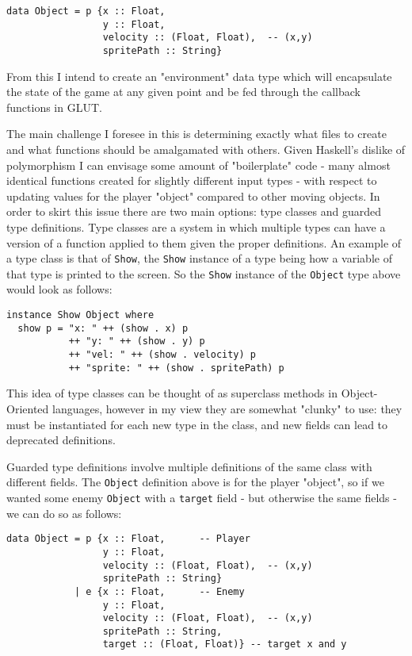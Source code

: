 \documentclass[12pt, a4paper]{report}
\begin{document}
\begin{lstlisting}[]
data Object = p {x :: Float,
                 y :: Float,
                 velocity :: (Float, Float),  -- (x,y)
                 spritePath :: String}
\end{lstlisting}

From this I intend to create an "environment" data type which will encapsulate the state of the game at any given point and be fed through the callback functions in GLUT.

\par

The main challenge I foresee in this is determining exactly what files to create and what functions should be amalgamated with others.
Given Haskell's dislike of polymorphism I can envisage some amount of "boilerplate" code - many almost identical functions created for slightly different input types - with respect to updating values for the player "object" compared to other moving objects.
In order to skirt this issue there are two main options: type classes and guarded type definitions.
Type classes are a system in which multiple types can have a version of a function applied to them given the proper definitions.
An example of a type class is that of \verb|Show|, the \verb|Show| instance of a type being how a variable of that type is printed to the screen.
So the \verb|Show| instance of the \verb|Object| type above would look as follows:

\begin{lstlisting}[]
instance Show Object where
  show p = "x: " ++ (show . x) p
           ++ "y: " ++ (show . y) p
           ++ "vel: " ++ (show . velocity) p
           ++ "sprite: " ++ (show . spritePath) p
\end{lstlisting}

This idea of type classes can be thought of as superclass methods in Object-Oriented languages, however in my view they are somewhat "clunky" to use: they must be instantiated for each new type in the class, and new fields can lead to deprecated definitions.

\par

Guarded type definitions involve multiple definitions of the same class with different fields.
The \verb|Object| definition above is for the player "object", so if we wanted some enemy \verb|Object| with a \verb|target| field - but otherwise the same fields - we can do so as follows:

\begin{lstlisting}[]
data Object = p {x :: Float,      -- Player
                 y :: Float,
                 velocity :: (Float, Float),  -- (x,y)
                 spritePath :: String}
            | e {x :: Float,      -- Enemy
                 y :: Float,
                 velocity :: (Float, Float),  -- (x,y)
                 spritePath :: String,
                 target :: (Float, Float)} -- target x and y
\end{lstlisting}
\end{document}

